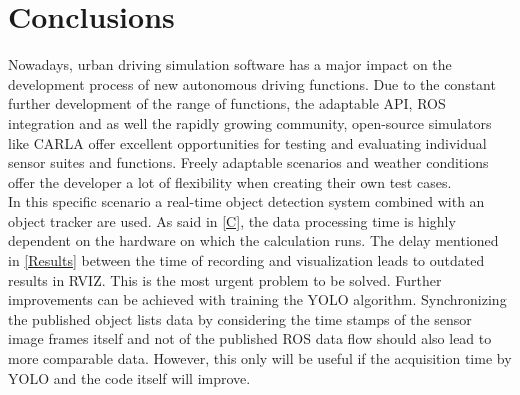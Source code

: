 \section{Conclusions}
	 Nowadays, urban driving simulation software has a major impact on the development process of new autonomous driving functions. Due to the constant further development of the range of functions, the adaptable \ac{API}, \ac{ROS} integration and as well the rapidly growing community, open-source simulators like CARLA offer excellent opportunities for testing and evaluating individual sensor suites and functions. Freely adaptable scenarios and weather conditions offer the developer a lot of flexibility when creating their own test cases.\\

	 In this specific scenario a real-time object detection system combined with an object tracker are used.
	 As said in \cref{C}, the data processing time is highly dependent on the hardware on which the calculation runs. The delay mentioned in \cref{Results} between the time of recording and visualization leads to outdated results in \ac{RVIZ}. This is the most urgent problem to be solved. Further improvements can be achieved with training the \ac{YOLO} algorithm.
	 Synchronizing the published object lists data by considering the time stamps of the sensor image frames itself and not of the published \ac{ROS} data flow should also lead to more comparable data.
	 However, this only will be useful if the acquisition time by \ac{YOLO} and the code itself will improve.
	 
	 
	
	 
	 
	
	 
	
	 
	 
	 
	